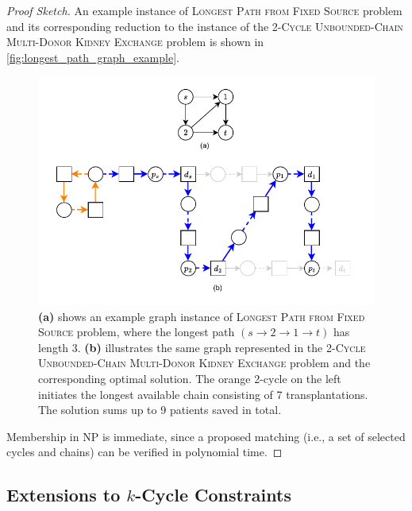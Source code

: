 \begin{proof}[Proof Sketch]
An example instance of \textsc{Longest Path from Fixed Source} problem and its corresponding reduction to the instance of the \textsc{2-Cycle Unbounded-Chain Multi-Donor Kidney Exchange} problem is shown in \autoref{fig:longest_path_graph_example}.

\begin{figure}
    \centering
    \includegraphics{data/longest_path_graph_example.pdf}
    \caption[An example instance of \textsc{Longest Path from Fixed Source} problem and its corresponding reduction to the instance of the \textsc{2-Cycle Unbounded-Chain Multi-Donor Kidney Exchange} problem]{\textbf{(a)} shows an example graph instance of \textsc{Longest Path from Fixed Source} problem, where the longest path $(s \rightarrow 2 \rightarrow 1 \rightarrow t)$ has length 3. \textbf{(b)} illustrates the same graph represented in the \textsc{2-Cycle Unbounded-Chain Multi-Donor Kidney Exchange} problem and the corresponding optimal solution. The orange 2-cycle on the left initiates the longest available chain consisting of 7 transplantations. The solution sums up to 9 patients saved in total.}
    \label{fig:longest_path_graph_example}
\end{figure}

Membership in NP is immediate, since a proposed matching (i.e., a set of selected cycles and chains) can be verified in polynomial time.
\end{proof}

\subsection{Extensions to \texorpdfstring{$k$}{k}-Cycle Constraints}

